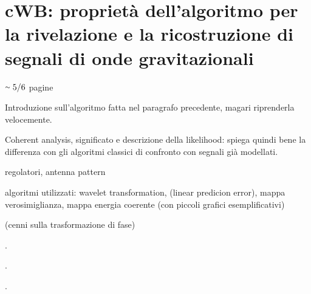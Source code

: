 \chapter[cWB]{cWB: proprietà dell'algoritmo per la rivelazione e la ricostruzione di segnali di onde gravitazionali}
\label{chapter:cwb}
\begin{center}
	$\smallsim 5/6$ pagine
\end{center}

Introduzione sull'algoritmo fatta nel paragrafo precedente, magari riprenderla velocemente.

Coherent analysis, significato e descrizione della likelihood: spiega quindi bene la differenza con gli algoritmi classici di confronto con segnali già modellati.

regolatori, antenna pattern

algoritmi utilizzati: wavelet transformation, (linear predicion error), mappa verosimiglianza, mappa energia coerente (con piccoli grafici esemplificativi)

(cenni sulla trasformazione di fase)

\lipsum[3]\cite{Abbott_2017a}.

\lipsum[4]\cite{Klimenko_2008}.

\lipsum[6]\cite{Klimenko_2016}.